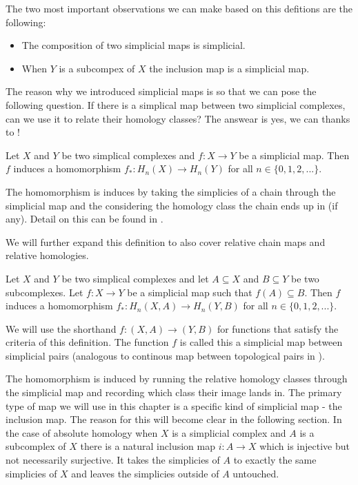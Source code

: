 The two most important observations we can make based on this defitions are the following:

\begin{itemize}
    \item The composition of two simplicial maps is simplicial.
    \item When $Y$ is a subcompex of $X$ the inclusion map is a simplicial map.
\end{itemize}


The reason why we introduced simplicial maps is so that we can pose the following question. If there is a simplical map between two simplicial complexes, can we use it to relate their homology classes? The answear is yes, we can thanks to \cite{combinatorial-algebraic-topology}!



\begin{defn} Let $X$ and $Y$ be two simplical complexes and $f: X \to Y$ be a simplicial map. Then $f$ induces a homomorphism $f_*: H_n(X) \to H_n(Y)$ for all $n \in \{0, 1, 2, ...\}$. \end{defn}

The homomorphism is induces by taking the simplicies of a chain through the simplicial map and the considering the homology class the chain ends up in (if any). Detail on this can be found in \cite{combinatorial-algebraic-topology}.

We will further expand this definition to also cover relative chain maps and relative homologies.

\begin{defn} Let $X$ and $Y$ be two simplical complexes and let $A \subseteq X$ and $B \subseteq Y$ be two subcomplexes. Let $f: X \to Y$ be a simplicial map such that $f(A) \subseteq B$. Then $f$ induces a homomorphism $f_*: H_n(X, A) \to H_n(Y, B)$ for all $n \in \{0, 1, 2, ...\}$. \end{defn}

We will use the shorthand $f: (X, A) \to (Y, B)$ for functions that satisfy the criteria of this definition. The function $f$ is called this a simplicial map between simplicial pairs (analogous to continous map between topological pairs in \cite{algebraic-topology}). 


The homomorphism is induced by running the relative homology classes through the simplicial map and recording which class their image lands in. The primary type of map we will use in this chapter is a specific kind of simplicial map - the inclusion map. The reason for this will become clear in the following section. In the case of absolute homology when $X$ is a simplicial complex and $A$ is a subcomplex of $X$ there is a natural inclusion map $i: A \to X$ which is injective but not necessarily surjective. It takes the simplicies of $A$ to exactly the same simplicies of $X$ and leaves the simplicies outside of $A$ untouched. 

